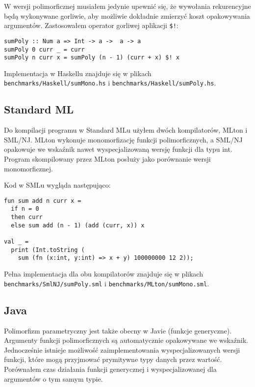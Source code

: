 \documentclass[declaration,shortabstract]{iithesis}
\begin{document}
W wersji polimorficznej musiałem jedynie upewnić się, że wywołania rekurencyjne 
będą wykonywane gorliwie, aby możliwie dokładnie zmierzyć koszt opakowywania 
argumentów. Zastosowałem operator gorliwej aplikacji \texttt{\$!}:

\begin{lstlisting}[frame=lines]
sumPoly :: Num a => Int -> a ->  a -> a
sumPoly 0 curr _ = curr 
sumPoly n curr x = sumPoly (n - 1) (curr + x) $! x
\end{lstlisting}

Implementacja w Haskellu znajduje się w plikach \newline
\texttt{benchmarks/Haskell/sumMono.hs} i \texttt{benchmarks/Haskell/sumPoly.hs}.

\subsection{Standard ML}

Do kompilacji programu w Standard MLu użyłem dwóch kompilatorów, MLton i SML/NJ.
MLton wykonuje monomorfizację funkcji polimorficznych, a SML/NJ opakowuje we 
wskaźnik nawet wyspecjalizowaną wersję funkcji dla typu int. Program skompilowany 
przez MLton posłuży jako porównanie wersji monomorficznej.

Kod w SMLu wygląda następująco:
\begin{lstlisting}[frame=lines]
fun sum add n curr x =
  if n = 0 
  then curr 
  else sum add (n - 1) (add (curr, x)) x

val _ = 
  print (Int.toString (
    sum (fn (x:int, y:int) => x + y) 100000000 12 2));
\end{lstlisting}
Pełna implementacja dla obu kompilatorów znajduje się w plikach \newline
\texttt{benchmarks/SmlNJ/sumPoly.sml} i \texttt{benchmarks/MLton/sumMono.sml}.

\subsection{Java}

Polimorfizm parametryczny jest także obecny w Javie (funkcje generyczne). 
Argumenty funkcji polimorficznych są automatycznie opakowywane we wskaźnik. 
Jednocześnie istnieje możliwość zaimplementowania wyspecjalizowanych wersji 
funkcji, które mogą przyjmować prymitywne typy danych przez wartość. Porównałem
czas działania funkcji generycznej i wyspecjalizowanej dla argumentów o tym samym 
typie. 
\end{document}
